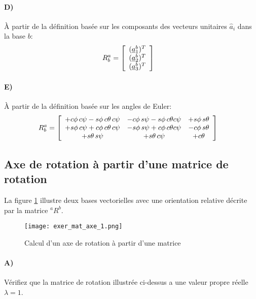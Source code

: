 \paragraph{D)} À partir de la définition basée sur les composants des vecteurs unitaires $\hat{a}_i$ dans la base $b$:
\begin{align}
	R_b^a &=
	\left[ \begin{array}{c}
			   (\underline{a}_1^b)^T \\
			   (\underline{a}_2^b)^T \\
			   (\underline{a}_3^b)^T
	\end{array} \right]
\end{align}
\paragraph{E)} À partir de la définition basée sur les angles de Euler:
\begin{align}
	R_b^a &=
	\left[ \begin{array}{c c c}
			   + c\phi \, c\psi - s\phi\,c\theta\,c\psi  & - c\phi \, s\psi - s\phi \, c\theta c\psi  & + s\phi \, s\theta  \\
			   + s\phi \, c\psi + c\phi\,c\theta\,c\psi  & - s\phi \, s\psi + c\phi \, c\theta c\psi  & - c\phi \, s\theta  \\
			   + s\theta \, s\psi                        & + s\theta \, c\psi                          & + c\theta
	\end{array}  \right]
\end{align}



\subsection{Axe de rotation à partir d'une matrice de rotation}

La figure \ref{fig:exer_mat_axe_1} illustre deux bases vectorielles avec une orientation relative décrite par la matrice ${}^aR^b$.
\begin{figure}[H]
	\centering
	\texttt{[image: exer\_mat\_axe\_1.png]}
	\caption{Calcul d'un axe de rotation à partir d'une matrice}
	\label{fig:exer_mat_axe_1}
\end{figure}

\paragraph{A)} Vérifiez que la matrice de rotation illustrée ci-dessus a une valeur propre réelle $\lambda=1$.
